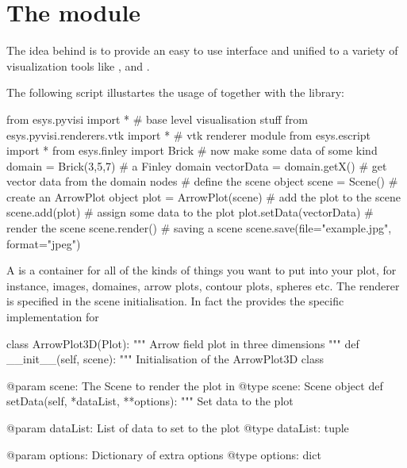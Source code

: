 %
%
\chapter{The module \pyvisi}

The idea behind is to provide an easy to use interface and unified to a variety of
visualization tools like \VTK, \OpenDX and \GnuPlot.

The following script illustartes the usage of \pyvisi together with the 
\VTK library:
\begin{python}
from esys.pyvisi import *                # base level visualisation stuff
from esys.pyvisi.renderers.vtk import *  # vtk renderer module
from esys.escript import *
from esys.finley import Brick
# now make some data of some kind
domain = Brick(3,5,7)  # a Finley domain
vectorData = domain.getX()  # get vector data from the domain nodes
# define the scene object
scene = Scene()
# create an ArrowPlot object
plot = ArrowPlot(scene)
# add the plot to the scene
scene.add(plot)
# assign some data to the plot
plot.setData(vectorData)
# render the scene
scene.render()
# saving a scene
scene.save(file="example.jpg", format="jpeg")
\begin{python}
A \Scene is a container for all of the kinds of things you want to put into your plot,
for instance, images, domaines, arrow plots, contour plots, spheres etc.
The renderer is specified in the scene initialisation. In fact the 
 provides the specific implementation for 
\VTK


\begin{verbose}
class ArrowPlot3D(Plot):
    """
    Arrow field plot in three dimensions
    """
    def __init__(self, scene):
        """
        Initialisation of the ArrowPlot3D class
        
        @param scene: The Scene to render the plot in
        @type scene: Scene object
    def setData(self, *dataList, **options):
        """
        Set data to the plot

        @param dataList: List of data to set to the plot
        @type dataList: tuple

        @param options: Dictionary of extra options
        @type options: dict


\end{verbose}
\end{python}
\end{python}
